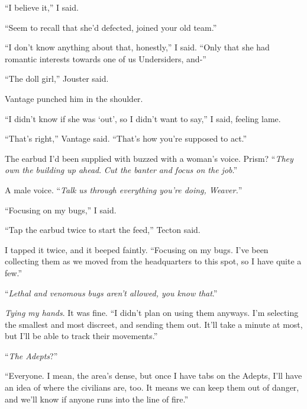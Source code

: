 ``I believe it,'' I said.



``Seem to recall that she'd defected, joined your old team.''



``I don't know anything about that, honestly,'' I said.  ``Only that she had romantic interests towards one of us Undersiders, and-''



``The doll girl,'' Jouster said.



Vantage punched him in the shoulder.



``I didn't know if she was `out', so I didn't want to say,'' I said, feeling lame.



``That's right,'' Vantage said.  ``That's how you're supposed to act.''



The earbud I'd been supplied with buzzed with a woman's voice.  Prism?  ``\emph{They own the building up ahead}.  \emph{Cut the banter }\emph{and focus on the job}.''



A male voice.  ``\emph{Talk us through everything you're doing, Weaver.}''



``Focusing on my bugs,'' I said.



``Tap the earbud twice to start the feed,'' Tecton said.



I tapped it twice, and it beeped faintly.  ``Focusing on my bugs.  I've been collecting them as we moved from the headquarters to this spot, so I have quite a few.''



``\emph{Lethal and venomous bugs aren't allowed, you know that}.''



\emph{Tying my hands}.  It was fine.  ``I didn't plan on using them anyways.  I'm selecting the smallest and most discreet, and sending them out.  It'll take a minute at most, but I'll be able to track their movements.''



``\emph{The Adepts}?''



``Everyone.  I mean, the area's dense, but once I have tabs on the Adepts, I'll have an idea of where the civilians are, too.  It means we can keep them out of danger, and we'll know if anyone runs into the line of fire.''



